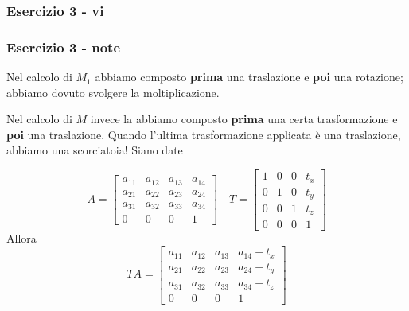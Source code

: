\documentclass{beamer}
\newcommand{\fig}{figures} %
\begin{document}
\begin{frame}
\frametitle{Esercizio 3 - vi}
    \vspace{-0.75cm}
\begin{center}
\end{center}
\end{frame}

\begin{frame}
\frametitle{Esercizio 3 - note}
    Nel calcolo di $M_1$ abbiamo composto \textbf{prima} una traslazione e \textbf{poi} una rotazione;
    abbiamo dovuto svolgere la moltiplicazione.
    
    Nel calcolo di $M$ invece la abbiamo composto \textbf{prima} una certa trasformazione e \textbf{poi} una traslazione.
    Quando l'ultima trasformazione applicata \`e una traslazione, abbiamo una scorciatoia! Siano date

\begin{displaymath}
    A = 
\begin{bmatrix}
    a_{11} & a_{12} & a_{13} & a_{14} \\
a_{21} & a_{22} & a_{23} & a_{24} \\
a_{31} & a_{32} & a_{33} & a_{34} \\
0      &    0   &  0     & 1 
\end{bmatrix}
    \quad
    T = 
\begin{bmatrix}
    1 & 0 & 0 & t_x \\
    0 & 1 & 0 & t_y \\
    0 & 0 & 1 & t_z \\
0      &    0   &  0     & 1 
\end{bmatrix}
\end{displaymath}
Allora
\begin{displaymath}
T A
    =  
\begin{bmatrix}
a_{11} & a_{12} & a_{13} & a_{14} + t_x\\
a_{21} & a_{22} & a_{23} & a_{24} + t_y\\
a_{31} & a_{32} & a_{33} & a_{34} + t_z\\
0      &    0   &  0     & 1 
\end{bmatrix}
\end{displaymath}

\end{frame}
\end{document}

